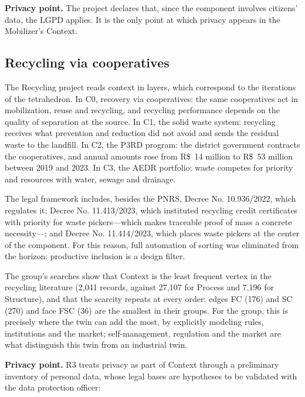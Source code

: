 \documentclass[12pt,a4paper,article,oneside,brazil,english]{abntex2}
\begin{document}
\textbf{Privacy point.} The project declares that, since the component involves citizens' data, the LGPD applies. It is the only point at which privacy appears in the Mobilizer's Context.

\subsection{Recycling via cooperatives}

The Recycling project reads context in layers, which correspond to the iterations of the tetrahedron. In C0, recovery via cooperatives: the same cooperatives act in mobilization, reuse and recycling, and recycling performance depends on the quality of separation at the source. In C1, the solid waste system: recycling receives what prevention and reduction did not avoid and sends the residual waste to the landfill. In C2, the P3RD program: the district government contracts the cooperatives, and annual amounts rose from R\$~14 million to R\$~53 million between 2019 and 2023. In C3, the AEDR portfolio: waste competes for priority and resources with water, sewage and drainage.

The legal framework includes, besides the PNRS, Decree No. 10.936/2022, which regulates it; Decree No. 11.413/2023, which instituted recycling credit certificates with priority for waste pickers---which makes traceable proof of mass a concrete necessity---; and Decree No. 11.414/2023, which places waste pickers at the center of the component. For this reason, full automation of sorting was eliminated from the horizon: productive inclusion is a design filter.

The group's searches show that Context is the least frequent vertex in the recycling literature (2,041 records, against 27,107 for Process and 7,196 for Structure), and that the scarcity repeats at every order: edges FC (176) and SC (270) and face FSC (36) are the smallest in their groups. For the group, this is precisely where the twin can add the most, by explicitly modeling rules, institutions and the market; self-management, regulation and the market are what distinguish this twin from an industrial twin.

\textbf{Privacy point.} R3 treats privacy as part of Context through a preliminary inventory of personal data, whose legal bases are hypotheses to be validated with the data protection officer:
\end{document}
